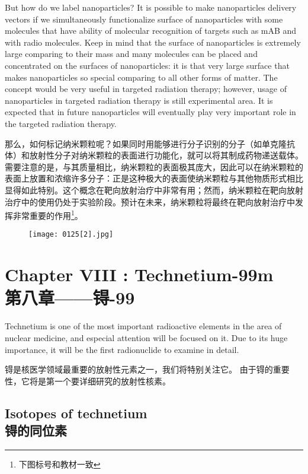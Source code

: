 \documentclass[dvipsnames, svgnames,a4paper,11pt]{article}
\begin{document}
But how do we label nanoparticles? It is possible
to make nanoparticles delivery vectors if we
simultaneously functionalize surface of
nanoparticles with some molecules that have
ability of molecular recognition of targets such as
mAB and with radio molecules. Keep in mind that
the surface of nanoparticles is extremely large
comparing to their mass and many molecules
can be placed and concentrated on the surfaces
of nanoparticles: it is that very large surface that
makes nanoparticles so special comparing to all
other forms of matter. The concept would be very
useful in targeted radiation therapy; however,
usage of nanoparticles in targeted radiation
therapy is still experimental area. It is expected
that in future nanoparticles will eventually play
very important role in the targeted radiation therapy.

那么，如何标记纳米颗粒呢？如果同时用能够进行分子识别的分子（如单克隆抗体）和放射性分子对纳米颗粒的表面进行功能化，就可以将其制成药物递送载体。需要注意的是，与其质量相比，纳米颗粒的表面极其庞大，因此可以在纳米颗粒的表面上放置和浓缩许多分子：正是这种极大的表面使纳米颗粒与其他物质形式相比显得如此特别。这个概念在靶向放射治疗中非常有用；然而，纳米颗粒在靶向放射治疗中的使用仍处于实验阶段。预计在未来，纳米颗粒将最终在靶向放射治疗中发挥非常重要的作用\footnote{下图标号和教材一致}。

\setcounter{figure}{128} 


\begin{figure}[h]
	\centering
    \texttt{[image: 0125[2].jpg]}  
     \label{fig129b}  
\end{figure}

\newpage

\section{Chapter VIII : Technetium-99m \\第八章——锝-99}

Technetium is one of the most important radioactive elements in the area of nuclear
medicine, and especial attention will be focused on it. Due to its huge importance, it
will be the first radionuclide to examine in detail.

锝是核医学领域最重要的放射性元素之一，我们将特别关注它。 由于锝的重要性，它将是第一个要详细研究的放射性核素。

\subsection{Isotopes of technetium \\锝的同位素}
\end{document}
